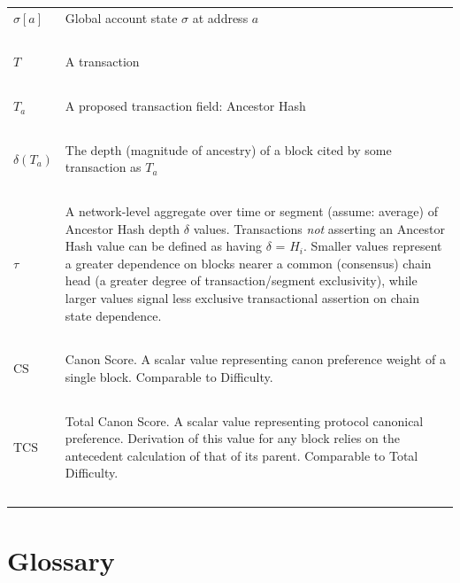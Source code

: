 \documentclass[11pt]{article}
\theoremstyle{plain}
\begin{document}
\begin{table}[H]
{\begin{tabular}{|p{5cm}|p{9cm}|}
$\sigma[a]$ & Global account state $\sigma$ at address $a$ \\~\\

$T$ & A transaction \\~\\

$T_a$ & A proposed transaction field: Ancestor Hash \\~\\

$\delta(T_a)$ & The depth (magnitude of ancestry) of a block cited by some
transaction as $T_a$ \\~\\

$\tau$ & A network-level aggregate over time or segment (assume: average) of
Ancestor Hash depth $\delta$ values. Transactions \textit{not} asserting an
Ancestor Hash value can be defined as having $\delta$ = $H_i$.
Smaller values represent a greater dependence on blocks nearer a common
(consensus) chain head (a greater degree of transaction/segment exclusivity),
while larger values signal less exclusive transactional assertion on chain
state dependence.
\\~\\

$\mathrm{CS}$ & Canon Score. A scalar value representing canon preference
weight of a single block. Comparable to Difficulty. \\~\\

$\mathrm{TCS}$ & Total Canon Score. A scalar value representing protocol
canonical preference. Derivation of this value for any block relies on the
antecedent calculation of that of its parent. Comparable to Total Difficulty.
\\~\\

\hline
\end{tabular}
}
\end{table}


\section{\normalsize{Glossary}}
\end{document}
